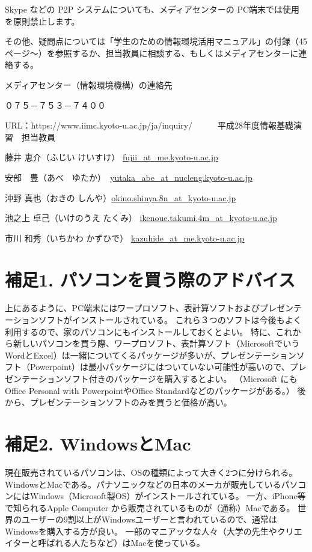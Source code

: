 Skype などの P2P システムについても、メディアセンターの PC端末では使用を原則禁止します。

その他、疑問点については「学生のための情報環境活用マニュアル」の付録（45ページ～）を参照するか、担当教員に相談する、もしくはメディアセンターに連絡する。


メディアセンター（情報環境機構）の連絡先

０７５－７５３－７４００

URL：https://www.iimc.kyoto-u.ac.jp/ja/inquiry/
　
　
平成28年度情報基礎演習　担当教員

藤井 恵介（ふじい けいすけ）	\url{fujii_at_me.kyoto-u.ac.jp}

安部　豊（あべ　ゆたか）　\url{yutaka_abe_at_nucleng.kyoto-u.ac.jp}

沖野 真也（おきの しんや）\url{okino.shinya.8n_at_kyoto-u.ac.jp}

池之上 卓己（いけのうえ たくみ） \url{ikenoue.takumi.4m_at_kyoto-u.ac.jp}

市川 和秀（いちかわ かずひで） \url{kazuhide_at_me.kyoto-u.ac.jp}

\section{補足1. パソコンを買う際のアドバイス}
上にあるように、PC端末にはワープロソフト、表計算ソフトおよびプレゼンテーションソフトがインストールされている。
これら３つのソフトは今後もよく利用するので、家のパソコンにもインストールしておくとよい。
特に、これから新しいパソコンを買う際、ワープロソフト、表計算ソフト（MicrosoftでいうWordとExcel）は一緒についてくるパッケージが多いが、プレゼンテーションソフト（Powerpoint）は最小パッケージにはついていない可能性が高いので、プレゼンテーションソフト付きのパッケージを購入するとよい。
（Microsoft にもOffice Personal with PowerpointやOffice Standardなどのパッケージがある。）
後から、プレゼンテーションソフトのみを買うと価格が高い。

\section{補足2. WindowsとMac}
現在販売されているパソコンは、OSの種類によって大きく2つに分けられる。
WindowsとMacである。パナソニックなどの日本のメーカが販売しているパソコンにはWindows（Microsoft製OS）がインストールされている。
一方、iPhone等で知られるApple Computer から販売されているものが（通称）Macである。
世界のユーザーの9割以上がWindowsユーザーと言われているので、通常はWindowsを購入する方が良い。
一部のマニアックな人々（大学の先生やクリエイターと呼ばれる人たちなど）はMacを使っている。
